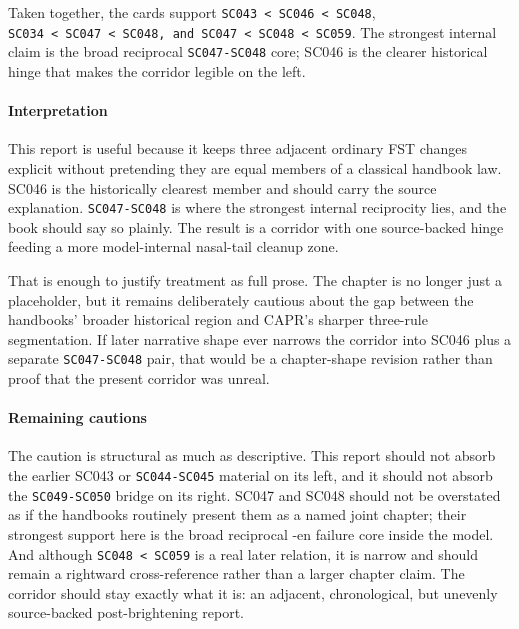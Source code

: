 \documentclass[
  british,
  a4paper,
]{article}
\begin{document}
Taken together, the cards support
\texttt{SC043\ \textless{}\ SC046\ \textless{}\ SC048},
\texttt{SC034\ \textless{}\ SC047\ \textless{}\ SC048,\ and\ SC047\ \textless{}\ SC048\ \textless{}\ SC059}.
The strongest internal claim is the broad reciprocal
\texttt{SC047-SC048} core; SC046 is the clearer historical hinge that
makes the corridor legible on the left.

\paragraph{Interpretation}\label{interpretation-29}

This report is useful because it keeps three adjacent ordinary FST
changes explicit without pretending they are equal members of a
classical handbook law. SC046 is the historically clearest member and
should carry the source explanation. \texttt{SC047-SC048} is where the
strongest internal reciprocity lies, and the book should say so plainly.
The result is a corridor with one source-backed hinge feeding a more
model-internal nasal-tail cleanup zone.

That is enough to justify treatment as full prose. The chapter is no
longer just a placeholder, but it remains deliberately cautious about
the gap between the handbooks' broader historical region and CAPR's
sharper three-rule segmentation. If later narrative shape ever narrows
the corridor into SC046 plus a separate \texttt{SC047-SC048} pair, that
would be a chapter-shape revision rather than proof that the present
corridor was unreal.

\paragraph{Remaining cautions}\label{remaining-cautions-29}

The caution is structural as much as descriptive. This report should not
absorb the earlier SC043 or \texttt{SC044-SC045} material on its left,
and it should not absorb the \texttt{SC049-SC050} bridge on its right.
SC047 and SC048 should not be overstated as if the handbooks routinely
present them as a named joint chapter; their strongest support here is
the broad reciprocal -en failure core inside the model. And although
\texttt{SC048\ \textless{}\ SC059} is a real later relation, it is
narrow and should remain a rightward cross-reference rather than a
larger chapter claim. The corridor should stay exactly what it is: an
adjacent, chronological, but unevenly source-backed post-brightening
report.
\end{document}

